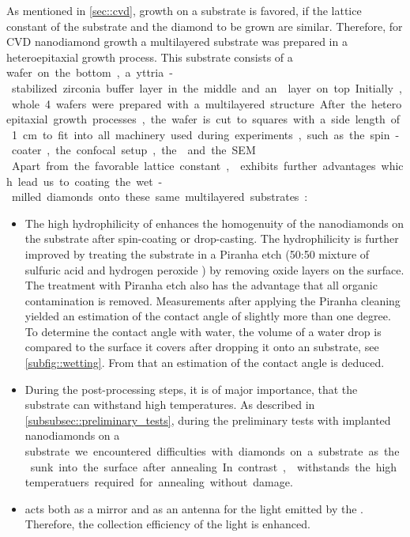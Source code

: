 	As mentioned in \autoref{sec::cvd}, growth on a substrate is favored, if the lattice constant of the substrate and the diamond to be grown are similar.
	Therefore, for CVD nanodiamond growth a multilayered substrate was prepared in a heteroepitaxial growth process. 
	This substrate consists of a \si wafer on the bottom, a yttria-stabilized zirconia buffer layer in the middle and an \ir layer on top. 
	Initially, whole \SI{4}{\inch} wafers were prepared with a multilayered structure.
	After the heteroepitaxial growth processes, the wafer is cut to squares with a side length of \SI{1}{cm} to fit into all machinery used during experiments, such as the spin-coater, the confocal setup, the \fib and the SEM.
	\\
	Apart from the favorable lattice constant, \ir exhibits further advantages which lead us to coating the wet-milled diamonds onto these same multilayered substrates:


	\begin{itemize}
		\item The high hydrophilicity of \ir enhances the homogenuity of the nanodiamonds on the substrate after spin-coating or drop-casting.
		The hydrophilicity is further improved by treating the substrate in a Piranha etch (50:50 mixture of sulfuric acid  and hydrogen peroxide ) by removing oxide layers on the surface.
		The treatment with Piranha etch also has the advantage that all organic contamination is removed.
		Measurements after applying the Piranha cleaning yielded an estimation of the contact angle of slightly more than one degree.
		To determine the contact angle with water, the volume of a water drop is compared to the surface it covers after dropping it onto an \ir substrate, see \autoref{subfig::wetting}.	From that an estimation of the contact angle is deduced.
		\item During the post-processing steps, it is of major importance, that the substrate can withstand high temperatures.
		As described in \autoref{subsubsec::preliminary_tests}, during the preliminary tests with implanted nanodiamonds on a \si substrate we encountered difficulties with diamonds on a \si substrate as the sunk into the surface after annealing.
		In contrast, \ir withstands the high temperatuers required for annealing without damage.
		\item \Ir acts both as a mirror and as an antenna for the \fl light emitted by the \siv \cite{Neu2012a}.
		Therefore, the collection efficiency of the \fl light is enhanced.
	\end{itemize}

